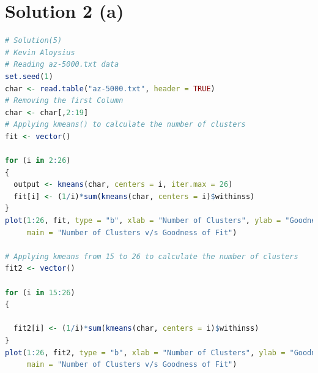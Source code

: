 \documentclass[a4paper,20pt]{article}
\begin{document}
\section*{Solution 2 (a)}
\begin{lstlisting}[language = R]
# Solution(5)
# Kevin Aloysius
# Reading az-5000.txt data
set.seed(1)
char <- read.table("az-5000.txt", header = TRUE)
# Removing the first Column
char <- char[,2:19]
# Applying kmeans() to calculate the number of clusters
fit <- vector()

for (i in 2:26)
{
  output <- kmeans(char, centers = i, iter.max = 26)
  fit[i] <- (1/i)*sum(kmeans(char, centers = i)$withinss)
}
plot(1:26, fit, type = "b", xlab = "Number of Clusters", ylab = "Goodness of Fit (withinss)",
     main = "Number of Clusters v/s Goodness of Fit")

# Applying kmeans from 15 to 26 to calculate the number of clusters
fit2 <- vector()

for (i in 15:26)
{
  
  fit2[i] <- (1/i)*sum(kmeans(char, centers = i)$withinss)
}
plot(1:26, fit2, type = "b", xlab = "Number of Clusters", ylab = "Goodness of Fit (withinss)",
     main = "Number of Clusters v/s Goodness of Fit")


\end{lstlisting}
\end{document}
